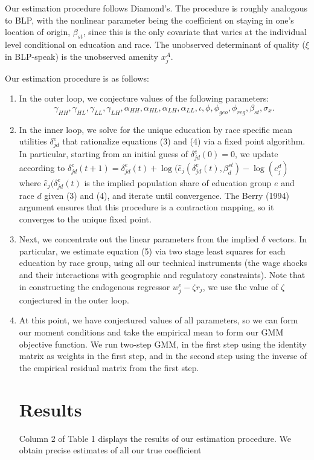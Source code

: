 \documentclass{article}
\begin{document}
Our estimation procedure follows Diamond's. The procedure is roughly analogous to BLP, with the nonlinear parameter being the coefficient on staying in one's location of origin, $\beta_{st}$, since this is the only covariate that varies at the individual level conditional on education and race. The unobserved determinant of quality ($\xi$ in BLP-speak) is the unobserved amenity $x_j^A$. 

Our estimation procedure is as follows: 
\begin{enumerate}
\item In the outer loop, we conjecture values of the following parameters: $$\gamma_{HH}, \gamma_{HL}, \gamma_{LL}, \gamma_{LH}, \alpha_{HH}, \alpha_{HL}, \alpha_{LH}, \alpha_{LL},  \iota, \phi, \phi_{geo}, \phi_{reg}, \beta_{st}, \sigma_x.$$
\item In the inner loop, we solve for the unique education by race specific mean utilities $\delta_{jd}^e$ that rationalize equations (3) and (4) via a fixed point algorithm. In particular, starting from an initial guess of $\delta_{jd}^e(0) =0$, we update according to $\delta_{jd}^e(t+1)=\delta_{jd}^e(t) + \log(\hat{e}_j(\delta_{jd}^e(t), \beta_d^{st}) - \log(e_j^d)$  where $\hat{e}_j(\delta_{jd}^e(t)$ is the implied population share of education group $e$ and race $d$ given (3) and (4), and iterate until convergence. The Berry (1994) argument ensures that this procedure is a contraction mapping, so it converges to the unique fixed point.


\item Next, we concentrate out the linear parameters from the implied $\delta$ vectors. In particular, we estimate equation (5) via two stage least squares for each education by race group, using all our technical instruments (the wage shocks and their interactions with geographic and regulatory constraints). Note that in constructing the endogenous regressor $w_j^e - \zeta r_j$, we use the value of $\zeta$ conjectured in the outer loop.

\item At this point, we have conjectured values of all parameters, so we can form our moment conditions and take the empirical mean to form our GMM objective function. We run two-step GMM, in the first step using the identity matrix as weights in the first step, and in the second step using the inverse of the empirical residual matrix from the first step. 

\section*{Results}
Column 2 of Table 1 displays the results of our estimation procedure. We obtain precise estimates of all our true coefficient
\end{enumerate}
\end{document}
